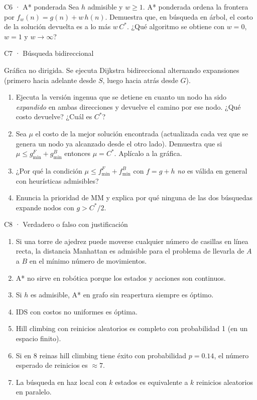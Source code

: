 \begin{ejercicio}{C6 · A* ponderada }
Sea $h$ admisible y $w\ge1$. A* ponderada ordena la frontera por $f_w(n)=g(n)+w\,h(n)$.
Demuestra que, en búsqueda en árbol, el costo de la solución devuelta es a lo más $w\,C^*$.
¿Qué algoritmo se obtiene con $w=0$, $w=1$ y $w\to\infty$?
\end{ejercicio}

\begin{ejercicio}{C7 · Búsqueda bidireccional }
\begin{center}\figBidir\end{center}
Gráfica no dirigida. Se ejecuta Dijkstra bidireccional alternando expansiones (primero hacia
adelante desde $S$, luego hacia atrás desde $G$).
\begin{enumerate}[label=(\alph*)]
\item Ejecuta la versión ingenua que se detiene en cuanto un nodo ha sido \emph{expandido} en ambas
direcciones y devuelve el camino por ese nodo. ¿Qué costo devuelve? ¿Cuál es $C^*$?
\item Sea $\mu$ el costo de la mejor solución encontrada (actualizada cada vez que se genera un nodo
ya alcanzado desde el otro lado). Demuestra que si $\mu\le g^F_{\min}+g^B_{\min}$ entonces $\mu=C^*$.
Aplícalo a la gráfica.
\item ¿Por qué la condición $\mu\le f^F_{\min}+f^B_{\min}$ con $f=g+h$ \emph{no} es válida en general
con heurísticas admisibles?
\item Enuncia la prioridad de MM y explica por qué ninguna de las dos búsquedas expande nodos con
$g>C^*/2$.
\end{enumerate}
\end{ejercicio}

\begin{ejercicio}{C8 · Verdadero o falso con justificación }
\begin{enumerate}[label=(\alph*)]
\item Si una torre de ajedrez puede moverse cualquier número de casillas en línea recta, la distancia
Manhattan es admisible para el problema de llevarla de $A$ a $B$ en el mínimo número de movimientos.
\item A* no sirve en robótica porque los estados y acciones son continuos.
\item Si $h$ es admisible, A* en grafo sin reapertura siempre es óptimo.
\item IDS con costos no uniformes es óptima.
\item Hill climbing con reinicios aleatorios es completo con probabilidad 1 (en un espacio finito).
\item Si en 8 reinas hill climbing tiene éxito con probabilidad $p=0.14$, el número esperado de reinicios es $\approx 7$.
\item La búsqueda en haz local con $k$ estados es equivalente a $k$ reinicios aleatorios en paralelo.
\end{enumerate}
\end{ejercicio}

